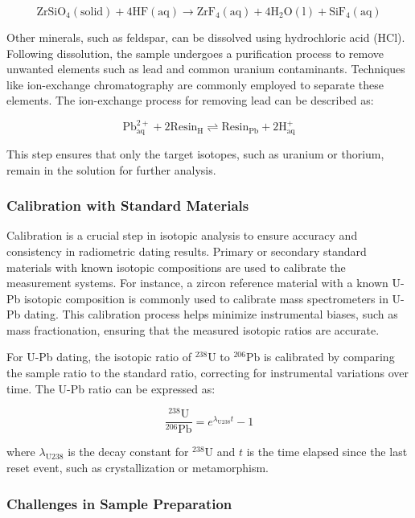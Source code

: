 \documentclass{article}
\begin{document}
\[
\text{ZrSiO}_4 (\text{solid}) + 4 \text{HF} (\text{aq}) \rightarrow \text{ZrF}_4 (\text{aq}) + 4 \text{H}_2\text{O} (\text{l}) + \text{SiF}_4 (\text{aq})
\]

Other minerals, such as feldspar, can be dissolved using hydrochloric acid (\(\text{HCl}\)). Following dissolution, the sample undergoes a purification process to remove unwanted elements such as lead and common uranium contaminants. Techniques like ion-exchange chromatography are commonly employed to separate these elements. The ion-exchange process for removing lead can be described as:

\[
\text{Pb}^{2+}_{\text{aq}} + 2 \text{Resin}_{\text{H}} \rightleftharpoons \text{Resin}_{\text{Pb}} + 2 \text{H}^+_{\text{aq}}
\]

This step ensures that only the target isotopes, such as uranium or thorium, remain in the solution for further analysis.

\subsubsection*{Calibration with Standard Materials}

Calibration is a crucial step in isotopic analysis to ensure accuracy and consistency in radiometric dating results. Primary or secondary standard materials with known isotopic compositions are used to calibrate the measurement systems. For instance, a zircon reference material with a known U-Pb isotopic composition is commonly used to calibrate mass spectrometers in U-Pb dating. This calibration process helps minimize instrumental biases, such as mass fractionation, ensuring that the measured isotopic ratios are accurate.

For U-Pb dating, the isotopic ratio of \(^{238}\text{U}\) to \(^{206}\text{Pb}\) is calibrated by comparing the sample ratio to the standard ratio, correcting for instrumental variations over time. The U-Pb ratio can be expressed as:

\[
\frac{^{238}\text{U}}{^{206}\text{Pb}} = e^{\lambda_{\text{U238}} t} - 1
\]

where \( \lambda_{\text{U238}} \) is the decay constant for \(^{238}\text{U}\) and \( t \) is the time elapsed since the last reset event, such as crystallization or metamorphism.

\subsubsection*{Challenges in Sample Preparation}
\end{document}
